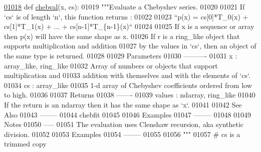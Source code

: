 \begin{DoxyCode}
\hypertarget{namespacepyneb_1_1utils_1_1chebyshev_l01018}{}\hyperlink{namespacepyneb_1_1utils_1_1chebyshev_a7f7442e9a3a00e1ca04a2283877b15a8}{01018} \textcolor{keyword}{def }\hyperlink{namespacepyneb_1_1utils_1_1chebyshev_a7f7442e9a3a00e1ca04a2283877b15a8}{chebval}(x, cs):
01019     \textcolor{stringliteral}{"""Evaluate a Chebyshev series.}
01020 \textcolor{stringliteral}{}
01021 \textcolor{stringliteral}{    If `cs` is of length `n`, this function returns :}
01022 \textcolor{stringliteral}{}
01023 \textcolor{stringliteral}{    ``p(x) = cs[0]*T\_0(x) + cs[1]*T\_1(x) + ... + cs[n-1]*T\_\{n-1\}(x)``}
01024 \textcolor{stringliteral}{}
01025 \textcolor{stringliteral}{    If x is a sequence or array then p(x) will have the same shape as x.}
01026 \textcolor{stringliteral}{    If r is a ring\_like object that supports multiplication and addition}
01027 \textcolor{stringliteral}{    by the values in `cs`, then an object of the same type is returned.}
01028 \textcolor{stringliteral}{}
01029 \textcolor{stringliteral}{    Parameters}
01030 \textcolor{stringliteral}{    ----------}
01031 \textcolor{stringliteral}{    x : array\_like, ring\_like}
01032 \textcolor{stringliteral}{        Array of numbers or objects that support multiplication and}
01033 \textcolor{stringliteral}{        addition with themselves and with the elements of `cs`.}
01034 \textcolor{stringliteral}{    cs : array\_like}
01035 \textcolor{stringliteral}{        1-d array of Chebyshev coefficients ordered from low to high.}
01036 \textcolor{stringliteral}{}
01037 \textcolor{stringliteral}{    Returns}
01038 \textcolor{stringliteral}{    -------}
01039 \textcolor{stringliteral}{    values : ndarray, ring\_like}
01040 \textcolor{stringliteral}{        If the return is an ndarray then it has the same shape as `x`.}
01041 \textcolor{stringliteral}{}
01042 \textcolor{stringliteral}{    See Also}
01043 \textcolor{stringliteral}{    --------}
01044 \textcolor{stringliteral}{    chebfit}
01045 \textcolor{stringliteral}{}
01046 \textcolor{stringliteral}{    Examples}
01047 \textcolor{stringliteral}{    --------}
01048 \textcolor{stringliteral}{}
01049 \textcolor{stringliteral}{    Notes}
01050 \textcolor{stringliteral}{    -----}
01051 \textcolor{stringliteral}{    The evaluation uses Clenshaw recursion, aka synthetic division.}
01052 \textcolor{stringliteral}{}
01053 \textcolor{stringliteral}{    Examples}
01054 \textcolor{stringliteral}{    --------}
01055 \textcolor{stringliteral}{}
01056 \textcolor{stringliteral}{    """}
01057     \textcolor{comment}{# cs is a trimmed copy}

\end{DoxyCode}
